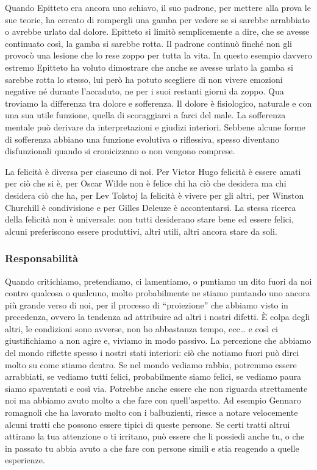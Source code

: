 \documentclass[12pt]{book} %
\begin{document}
Quando Epitteto era ancora uno schiavo, il suo padrone, per mettere alla prova le sue teorie, ha cercato di rompergli
una gamba per vedere se si sarebbe arrabbiato o avrebbe urlato dal dolore. Epitteto si limitò semplicemente a dire, che
se avesse continuato così, la gamba si sarebbe rotta. Il padrone continuò finché non gli provocò una lesione che lo
rese zoppo per tutta la vita. In questo esempio davvero estremo Epitteto ha voluto dimostrare che anche se avesse
urlato la gamba si sarebbe rotta lo stesso, lui però ha potuto scegliere di non vivere emozioni negative né durante
l'accaduto, ne per i suoi restanti giorni da zoppo. Qua troviamo la differenza tra dolore e
sofferenza. Il dolore è fisiologico, naturale e con una sua utile funzione, quella di scoraggiarci a farci del male. La sofferenza mentale può derivare da interpretazioni e giudizi interiori. Sebbene alcune forme di sofferenza abbiano una funzione evolutiva o riflessiva, spesso diventano disfunzionali quando si cronicizzano o non vengono comprese.

La felicità è diversa per ciascuno di noi. Per Victor Hugo felicità è essere amati per ciò che si è, per Oscar Wilde non
è felice chi ha ciò che desidera ma chi desidera ciò che ha, per Lev Tolstoj la felicità è vivere per gli altri, per
Winston Churchill è condivisione e per Gilles Deleuze è accontentarsi. La stessa ricerca della felicità non è
universale: non tutti desiderano stare bene ed essere felici, alcuni preferiscono essere produttivi, altri utili, altri
ancora stare da soli.

\subsubsection{Responsabilità}
Quando critichiamo, pretendiamo, ci
lamentiamo, o puntiamo un dito fuori da noi contro qualcosa o qualcuno, molto probabilmente ne stiamo puntando uno
ancora più grande verso di noi, per il processo di “proiezione” che abbiamo visto in precedenza, ovvero la tendenza ad
attribuire ad altri i nostri difetti. È colpa degli altri, le condizioni sono avverse, non ho abbastanza tempo, ecc… e
così ci giustifichiamo a non agire e, viviamo in modo passivo. La percezione che abbiamo del mondo riflette spesso i nostri stati interiori: ciò che notiamo fuori può dirci molto su come stiamo dentro. Se nel mondo vediamo rabbia, potremmo essere arrabbiati, se vediamo tutti felici, probabilmente siamo
felici, se vediamo paura siamo spaventati e così via. Potrebbe anche essere che non riguarda strettamente noi ma abbiamo avuto molto a che fare con quell'aspetto. Ad esempio Gennaro romagnoli che ha lavorato molto con i balbuzienti, riesce a notare velocemente alcuni tratti che possono essere tipici di queste persone. Se certi tratti altrui attirano la tua attenzione o ti irritano, può essere che li possiedi anche tu, o che in passato tu abbia avuto a che fare con persone simili e stia reagendo a quelle esperienze.
\end{document}
